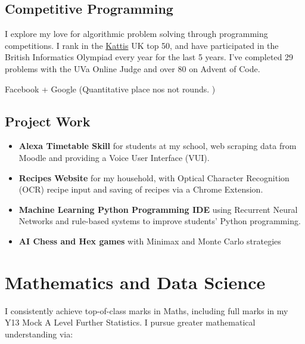 \documentclass{Resume}
\begin{document}
		\subsection{Competitive Programming}
			I explore my love for algorithmic problem solving through programming competitions. I rank in the \href{https://open.kattis.com/countries/GBR}{Kattis} UK top 50, and have participated in the British Informatics Olympiad every year for the last 5 years. I've completed 29 problems with the UVa Online Judge and over 80 on Advent of Code.
			
			Facebook + Google (Quantitative place nos not rounds. ) 

		\subsection{Project Work}
			\begin{itemize}[itemsep=1mm, parsep=0pt]
				\item \textbf{Alexa Timetable Skill} for students at my school, web scraping data from Moodle and providing a Voice User Interface (VUI).
				\item \textbf{Recipes Website} for my household, with Optical Character Recognition (OCR) recipe input and saving of recipes via a Chrome Extension.
				\item \textbf{Machine Learning Python Programming IDE} using Recurrent Neural Networks and rule-based systems to improve students' Python programming. %
				\item \textbf{AI Chess and Hex games} with Minimax and Monte Carlo strategies
			\end{itemize}

	\section{Mathematics and Data Science}
		I consistently achieve top-of-class marks in Maths, including full marks in my Y13 Mock A Level Further Statistics. I pursue greater mathematical understanding via:
\end{document}

